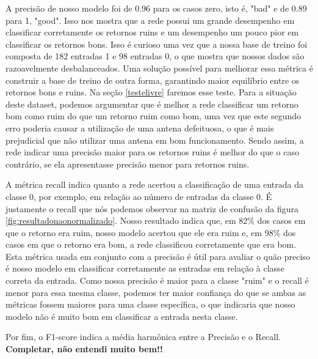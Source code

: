 \documentclass[12pt]{article}
\begin{document}
A precisão de nosso modelo foi de 0.96 para os casos zero, isto é, "bad" e de 0.89 para 1, "good". Isso nos mostra que a rede possui um grande desempenho em classificar corretamente os retornos ruins e um desempenho um pouco pior em classificar os retornos bons. Isso é curioso uma vez que a nossa base de treino foi composta de 182 entradas 1 e 98 entradas 0, o que mostra que nossos dados são razoavelmente desbalanceados. Uma solução possível para melhorar essa métrica é construir a base de treino de outra forma, garantindo maior equilíbrio entre os retornos bons e ruins. Na seção \ref{testelivre} faremos esse teste. Para a situação deste dataset, podemos argumentar que é melhor a rede classificar um retorno bom como ruim do que um retorno ruim como bom, uma vez que este segundo erro poderia causar a utilização de uma antena defeituosa, o que é mais prejudicial que não utilizar uma antena em bom funcionamento. Sendo assim, a rede indicar uma precisão maior para os retornos ruins é melhor do que o caso contrário, se ela apresentasse precisão menor para retornos ruins.

A métrica recall indica quanto a rede acertou a classificação de uma entrada da classe 0, por exemplo, em relação ao número de entradas da classe 0. É justamente o recall que nós podemos observar na matriz de confusão da figura \ref{fig:resultadonaonormalizado}. Nosso resultado indica que, em 82\% dos casos em que o retorno era ruim, nosso modelo acertou que ele era ruim e, em 98\% dos casos em que o retorno era bom, a rede  classificou corretamente que era bom. Esta métrica usada em conjunto com a precisão é útil para avaliar o quão preciso é nosso modelo em classificar corretamente as entradas em relação à classe correta da entrada. Como nossa precisão é maior para a classe "ruim" e o recall é menor para essa mesma classe, podemos ter maior confiança do que se ambas as métricas fossem maiores para uma classe específica, o que indicaria que nosso modelo não é muito bom em classificar a entrada nesta classe.

Por fim, o F1-score  indica a média harmônica entre a Precisão e o Recall. \textbf{Completar, não entendi muito bem!!}
\end{document}
